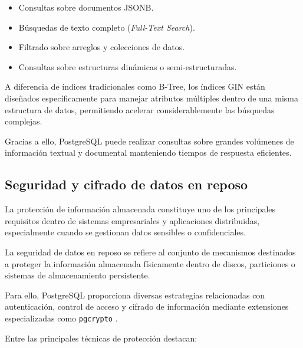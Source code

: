\begin{itemize}

\item Consultas sobre documentos JSONB.

\item Búsquedas de texto completo (\textit{Full-Text Search}).

\item Filtrado sobre arreglos y colecciones de datos.

\item Consultas sobre estructuras dinámicas o semi-estructuradas.
\end{itemize}

A diferencia de índices tradicionales como B-Tree, los índices GIN están diseñados específicamente para manejar atributos múltiples dentro de una misma estructura de datos, permitiendo acelerar considerablemente las búsquedas complejas.

Gracias a ello, PostgreSQL puede realizar consultas sobre grandes volúmenes de información textual y documental manteniendo tiempos de respuesta eficientes.

\subsection{Seguridad y cifrado de datos en reposo}

La protección de información almacenada constituye uno de los principales requisitos dentro de sistemas empresariales y aplicaciones distribuidas, especialmente cuando se gestionan datos sensibles o confidenciales.

La seguridad de datos en reposo se refiere al conjunto de mecanismos destinados a proteger la información almacenada físicamente dentro de discos, particiones o sistemas de almacenamiento persistente.

Para ello, PostgreSQL proporciona diversas estrategias relacionadas con autenticación, control de acceso y cifrado de información mediante extensiones especializadas como \texttt{pgcrypto} \cite{60}.

Entre las principales técnicas de protección destacan:

